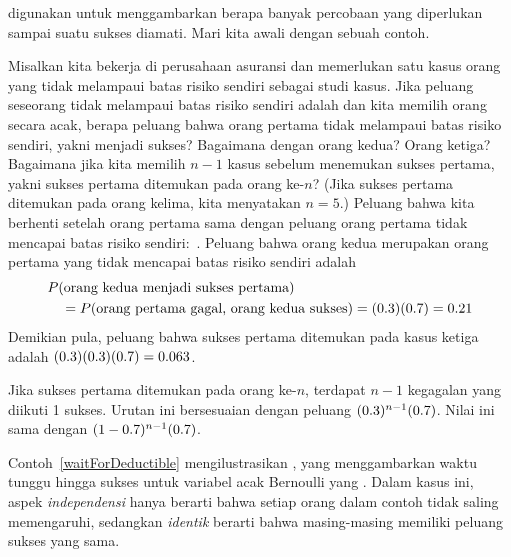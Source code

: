  digunakan untuk
menggambarkan berapa banyak percobaan yang diperlukan sampai suatu sukses
diamati. Mari kita awali dengan sebuah contoh.

\begin{examplewrap}
\begin{nexample}{Misalkan kita bekerja di perusahaan asuransi dan
    memerlukan satu kasus orang yang tidak melampaui batas risiko sendiri
    sebagai studi kasus. Jika peluang seseorang tidak melampaui batas
    risiko sendiri adalah \insureSprob{} dan kita memilih orang secara acak,
    berapa peluang bahwa orang pertama tidak melampaui batas risiko sendiri,
    yakni menjadi sukses? Bagaimana dengan orang kedua? Orang ketiga?
    Bagaimana jika kita memilih $n - 1$ kasus sebelum menemukan sukses
    pertama, yakni sukses pertama ditemukan pada orang ke-$n$?
    (Jika sukses pertama ditemukan pada orang kelima, kita menyatakan
    $n=5$.)}
  \label{waitForDeductible}%
  Peluang bahwa kita berhenti setelah orang pertama sama dengan peluang
  orang pertama tidak mencapai batas risiko sendiri:~\insureSprob{}.
  Peluang bahwa orang kedua merupakan orang pertama yang tidak mencapai
  batas risiko sendiri adalah
  \begin{align*}
  &P(\text{orang kedua menjadi sukses pertama}) \\
  &\quad
    = P(\text{orang pertama gagal, orang kedua sukses})
    = (0.3{})(0.7{})
    = 0.21{}
  \end{align*}
  Demikian pula, peluang bahwa sukses pertama ditemukan pada kasus ketiga
  adalah $(0.3{})(0.3{})(0.7{})
    = 0.063$.

  Jika sukses pertama ditemukan pada orang ke-$n$, terdapat $n-1$
  kegagalan yang diikuti 1 sukses. Urutan ini bersesuaian dengan peluang
  $(0.3{})^{n-1}(0.7{})$.
  Nilai ini sama dengan
  $(1-0.7{})^{n-1}(0.7{})$.
\end{nexample}
\end{examplewrap}

Contoh~\ref{waitForDeductible} mengilustrasikan
, yang menggambarkan
waktu tunggu hingga sukses untuk variabel acak Bernoulli yang
.
Dalam kasus ini, aspek \emph{independensi} hanya berarti
bahwa setiap orang dalam contoh tidak saling memengaruhi, sedangkan
\emph{identik} berarti bahwa masing-masing memiliki peluang sukses yang
sama.

